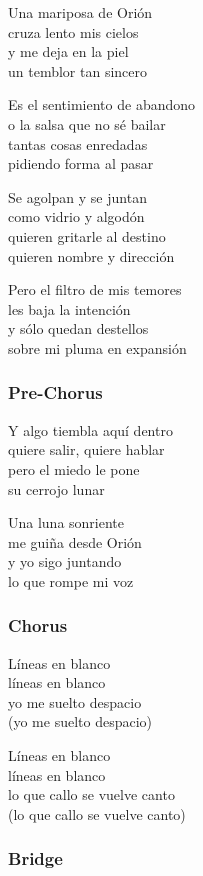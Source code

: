 \documentclass[]{article}
\begin{document}
Una mariposa de Orión\\
cruza lento mis cielos\\
y me deja en la piel\\
un temblor tan sincero

Es el sentimiento de abandono\\
o la salsa que no sé bailar\\
tantas cosas enredadas\\
pidiendo forma al pasar

Se agolpan y se juntan\\
como vidrio y algodón\\
quieren gritarle al destino\\
quieren nombre y dirección

Pero el filtro de mis temores\\
les baja la intención\\
y sólo quedan destellos\\
sobre mi pluma en expansión

\subsubsection{Pre-Chorus}\label{pre-chorus-25}

Y algo tiembla aquí dentro\\
quiere salir, quiere hablar\\
pero el miedo le pone\\
su cerrojo lunar

Una luna sonriente\\
me guiña desde Orión\\
y yo sigo juntando\\
lo que rompe mi voz

\subsubsection{Chorus}\label{chorus-41}

Líneas en blanco\\
líneas en blanco\\
yo me suelto despacio\\
(yo me suelto despacio)

Líneas en blanco\\
líneas en blanco\\
lo que callo se vuelve canto\\
(lo que callo se vuelve canto)

\subsubsection{Bridge}\label{bridge-10}
\end{document}
